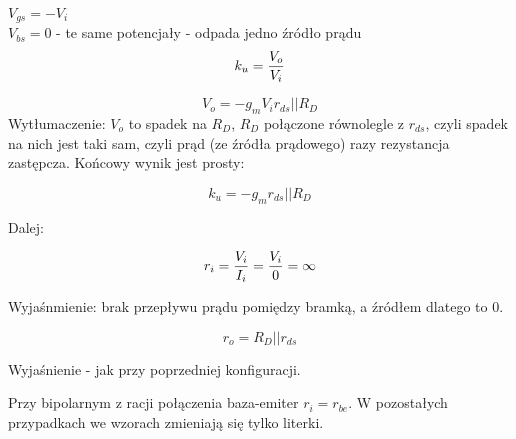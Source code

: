 \documentclass[10pt,a4paper]{article}
\begin{document}
$V_{gs} = -V_i$\\
$V_{bs} = 0$ - te same potencjały - odpada jedno źródło prądu\\

\begin{equation}
k_u = {V_o \over V_i}
\end{equation}

\begin{equation}
V_o = -g_mV_i{r_{ds}||R_D}
\end{equation}
Wytłumaczenie: $V_o$ to spadek na $R_D$, $R_D$ połączone równolegle z $r_{ds}$, czyli spadek na nich jest taki sam, czyli prąd (ze źródła prądowego) razy rezystancja zastępcza. Końcowy wynik jest prosty:

\begin{equation}
k_u = -g_m{r_{ds}||R_D}
\end{equation}

Dalej:

\begin{equation}
r_i = {V_i \over I_i} = {V_i \over 0} = \infty
\end{equation}

Wyjaśnmienie: brak przepływu prądu pomiędzy bramką, a źródłem dlatego to 0.

\begin{equation}
r_o = R_D || r_{ds}
\end{equation}

Wyjaśnienie - jak przy poprzedniej konfiguracji.

Przy bipolarnym z racji połączenia baza-emiter $r_i = r_{be}$. W pozostałych przypadkach we wzorach zmieniają się tylko literki.
\end{document}
